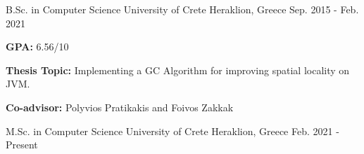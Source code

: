 
\begin{cventries}

  \cventry
    {B.Sc. in Computer Science} %
    {University of Crete} %
    {Heraklion, Greece} %
    {Sep. 2015 - Feb. 2021} %
    {
      \begin{cvitems} %
      \item{\textbf{GPA:} 6.56/10}
      \item{\textbf{Thesis Topic:} Implementing a GC Algorithm for improving spatial locality on JVM.}
        \item{\textbf{Co-advisor:} Polyvios Pratikakis and Foivos Zakkak}
      \end{cvitems}
    }


  \cventry
    {M.Sc. in Computer Science} %
    {University of Crete} %
    {Heraklion, Greece} %
    {Feb. 2021 -  Present} %
    {
      \begin{cvitems} %
	\item{}
      \end{cvitems}
    }
\end{cventries}
